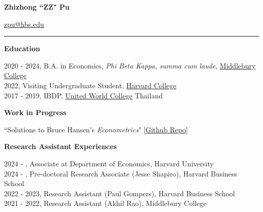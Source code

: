 \documentclass{article}
\begin{document}
{\Large \textbf{Zhizhong ``ZZ" Pu}\par}
    \href{mailto:zpu@hbs.edu}{zpu@hbs.edu} \href{https://github.com/zhizhongpu}{\faGithub} \hspace{0.2em} \\
    \vspace{-0.1in}
    \rule{\textwidth}{1pt}
    \vspace{0in}

{\Large \textbf{Education}}\\
    \vspace{-0.15in}
	\begin{adjustwidth}{1.5em}{0pt}
        2020 - 2024, B.A. in Economics, \textit{Phi Beta Kappa, summa cum laude}, \href{http://www.middlebury.edu/}{Middlebury College}\\
        2022, Visiting Undergraduate Student, \href{http://www.harvard.edu/}{Harvard College}\\
        2017 - 2019, IBDP, \href{https://www.uwc.org/about}{United World College} Thailand
    \end{adjustwidth}
    \vspace{0.1in}


{\Large \textbf{Work in Progress}}\\
    \vspace{-0.15in}
	\begin{adjustwidth}{1.5em}{0pt}     
        ``Solutions to Bruce Hansen's \textit{Econometrics}" [\href{https://github.com/zhizhongpu/solutions_econometrics_hansen}{Github Repo}]
    \end{adjustwidth}
    \vspace{0.1in}
	
{\Large \textbf{Research Assistant Experiences}}
\begin{adjustwidth}{1.5em}{0pt}
    2024 - , Associate at Department of Economics, Harvard University \\
    2024 - , Pre-doctoral Research Associate (Jesse Shapiro), Harvard Business School \\
    2022 - 2023, Research Assistant (Paul Gompers), Harvard Business School \\
    2021 - 2022, Research Assistant (Akhil Rao), Middlebury College
\end{adjustwidth}
\vspace{0.1in}

\end{document}
